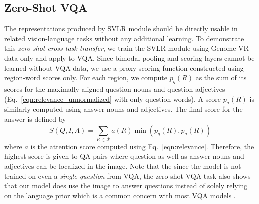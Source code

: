 \documentclass[10pt,twocolumn,letterpaper]{article}
\begin{document}


\subsection{Zero-Shot VQA} 

The representations produced by SVLR module should be directly usable in related vision-language tasks without any additional learning. To demonstrate this \textit{zero-shot cross-task transfer}, we train the SVLR module using Genome VR data only and apply to VQA. Since bimodal pooling and scoring layers cannot be learned without VQA data, we use a proxy scoring function constructed using region-word scores only.  For each region, we compute $p_q(R)$ as the sum of its scores for the maximally aligned question nouns and question adjectives (Eq.~\ref{eqn:relevance_unnormalized} with only question words). A score $p_a(R)$ is similarly computed using answer nouns and adjectives. The final score for the answer is defined by
\begin{equation}
    S(Q,I,A)=\sum_{R\in\mathcal{R}}a(R)\min(p_q(R),p_a(R))
\end{equation}
where $a$ is the attention score computed using Eq.~\ref{eqn:relevance}. Therefore, the highest score is given to QA pairs where question as well as answer nouns and adjectives can be localized in the image. Note that the since the model is not trained on even a \textit{single question} from VQA, the zero-shot VQA task also shows that our model does use the image to answer questions instead of solely relying on the language prior which is a common concern with most VQA models \cite{agrawal2016analyzing,goyal2016arxiv}. 
\end{document}
